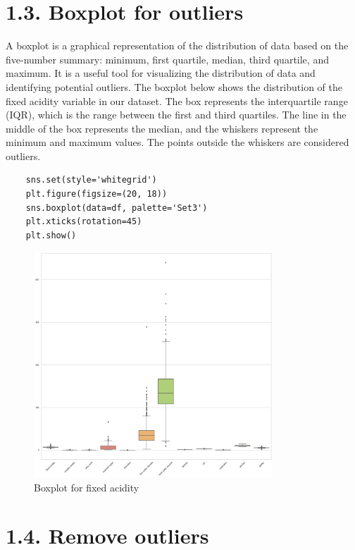 \documentclass{report}
\begin{document}
\section*{1.3. Boxplot for outliers}

A boxplot is a graphical representation of the distribution of data based on the five-number summary: minimum, first quartile, median, third quartile, and maximum. It is a useful tool for visualizing the distribution of data and identifying potential outliers. The boxplot below shows the distribution of the fixed acidity variable in our dataset. The box represents the interquartile range (IQR), which is the range between the first and third quartiles. The line in the middle of the box represents the median, and the whiskers represent the minimum and maximum values. The points outside the whiskers are considered outliers.\\

\begin{lstlisting}
    sns.set(style='whitegrid')
    plt.figure(figsize=(20, 18))
    sns.boxplot(data=df, palette='Set3')
    plt.xticks(rotation=45)
    plt.show()
\end{lstlisting}

\begin{figure}
    \centering
    \includegraphics[width=0.8\textwidth]{images/19.png}
    \caption{Boxplot for fixed acidity}
    \label{fig:Boxplot for fixed acidity}
\end{figure}


\section*{1.4. Remove outliers}
\end{document}
